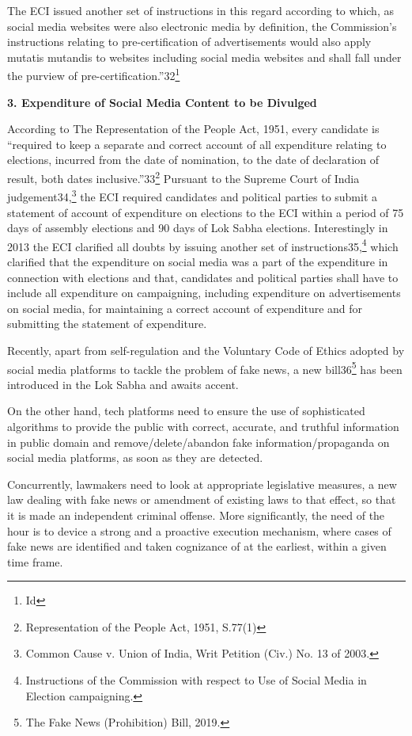 \begin{multicols}{2}
\noi
The ECI issued another set of instructions in this regard according to which, as social media
websites were also electronic media by definition, the Commission’s instructions relating to 
pre-certification of advertisements would also apply mutatis mutandis to websites including
social media websites and shall fall under the purview of pre-certification.”32\footnote{Id}

\noi
{\large\bfseries 3. Expenditure of Social Media Content to be Divulged}

\noi
According to The Representation of the People Act, 1951, every candidate is “required to
keep a separate and correct account of all expenditure relating to elections, incurred from the
date of nomination, to the date of declaration of result, both dates inclusive.”33\footnote{Representation of the People Act, 1951, S.77(1)} Pursuant to
the Supreme Court of India judgement34,\footnote{Common Cause v. Union of India, Writ Petition (Civ.) No. 13 of 2003.} the ECI required candidates and political parties to
submit a statement of account of expenditure on elections to the ECI within a period of 75
days of assembly elections and 90 days of Lok Sabha elections. Interestingly in 2013 the ECI
clarified all doubts by issuing another set of instructions35,\footnote{Instructions of the Commission with respect to Use of Social Media in Election campaigning.} which clarified that the
expenditure on social media was a part of the expenditure in connection with elections and
that, candidates and political parties shall have to include all expenditure on campaigning,
including expenditure on advertisements on social media, for maintaining a correct account
of expenditure and for submitting the statement of expenditure.

\noi
Recently, apart from self-regulation and the Voluntary Code of Ethics adopted by social
media platforms to tackle the problem of fake news, a new bill36\footnote{The Fake News (Prohibition) Bill, 2019.} has been introduced in the
Lok Sabha and awaits accent.

\noi
On the other hand, tech platforms need to ensure the use of sophisticated algorithms to
provide the public with correct, accurate, and truthful information in public domain and
remove/delete/abandon fake information/propaganda on social media platforms, as soon as
they are detected.

\newpage

\noi
Concurrently, lawmakers need to look at appropriate legislative measures, a new law dealing
with fake news or amendment of existing laws to that effect, so that it is made an independent
criminal offense. More significantly, the need of the hour is to device a strong and a proactive
execution mechanism, where cases of fake news are identified and taken cognizance of at the
earliest, within a given time frame. 

\end{multicols}
